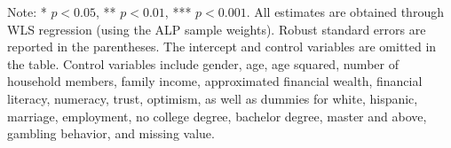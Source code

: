 \documentclass[12pt]{article}
\begin{document}
\begin{table}
    \vspace*{4pt}
    \centering
    \begin{minipage}{0.85\textwidth}
    {\par\footnotesize Note: * $p<0.05$, ** $p<0.01$, *** $p<0.001$. All estimates are obtained through WLS regression (using the ALP sample weights). Robust standard errors are reported in the parentheses. The intercept and control variables are omitted in the table. Control variables include gender, age, age squared, number of household members, family income, approximated financial wealth, financial literacy, numeracy, trust, optimism, as well as dummies for white, hispanic, marriage, employment, no college degree, bachelor degree, master and above, gambling behavior, and missing value.}
    \end{minipage}
    \label{tab:probweigh_reg}
\end{table}
\end{document}
